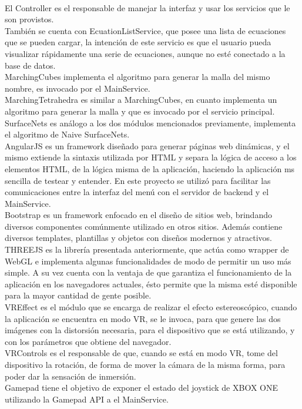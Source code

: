 \documentclass[12pt]{article}
\begin{document}
\\El Controller es el responsable de manejar la interfaz y usar los servicios que le son provistos.
\\También se cuenta con EcuationListService, que posee una lista de ecuaciones que se pueden cargar, la intención de este servicio es que el usuario pueda visualizar rápidamente una serie de ecuaciones, aunque no esté conectado a la base de datos.
\\MarchingCubes implementa el algoritmo para generar la malla del mismo nombre, es invocado por el MainService.
\\MarchingTetrahedra es similar a MarchingCubes, en cuanto implementa un algoritmo para generar la malla y que es invocado por el servicio principal.
\\SurfaceNets es análogo a los dos módulos mencionados previamente, implementa el algoritmo de Naive SurfaceNets.
\\AngularJS es un framework diseñado para generar páginas web dinámicas, y el mismo extiende la sintaxis utilizada por HTML y separa la lógica de acceso a los elementos HTML, de la lógica misma de la aplicación, haciendo la aplicación ms sencilla de testear y entender. En este proyecto se utilizó para facilitar las comunicaciones entre la interfaz del menú con el servidor de backend y el MainService.
\\Bootstrap es un framework enfocado en el diseño de sitios web, brindando diversos componentes comúnmente utilizado en otros sitios. Además contiene diversos templates, plantillas y objetos con diseños modernos y atractivos. 
\\THREEJS es la librería presentada anteriormente, que actúa como wrapper de WebGL e implementa algunas funcionalidades de modo de permitir un uso más simple. A su vez cuenta con la ventaja de que garantiza el funcionamiento de la aplicación en los navegadores actuales, ésto permite que la misma esté disponible para la mayor cantidad de gente posible.
\\VREffect es el módulo que se encarga de realizar el efecto estereoscópico, cuando la aplicación se encuentra en modo VR, se le invoca, para que genere las dos imágenes con la distorsión necesaria, para el dispositivo que se está utilizando, y con los parámetros que obtiene del navegador.
\\VRControls es el responsable de que, cuando se está en modo VR, tome del dispositivo la rotación, de forma de mover la cámara de la misma forma, para poder dar la sensación de inmersión.
\\Gamepad tiene el objetivo de exponer el estado del joystick de XBOX ONE utilizando la Gamepad API\cite{gamepadapi} a el MainService.
\end{document}
